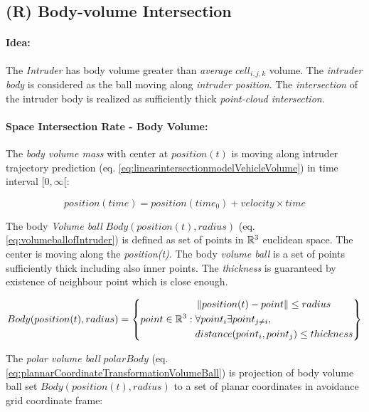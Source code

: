 \subsection{(R) Body-volume Intersection}\label{s:bodyvolumeIntersection}
\paragraph{Idea:} The \emph{Intruder} has \empty body volume greater than \emph{average} $cell_{i,j,k}$ volume. The \emph{intruder body} is considered as the ball moving along \emph{intruder position}. The \emph{intersection} of the intruder body is realized as sufficiently thick \emph{point-cloud intersection}.

\paragraph{Space Intersection Rate - Body Volume:} The \emph{body volume mass} with center at $position(t)$ is moving along intruder trajectory prediction (eq. \ref{eq:linearintersectionmodelVehicleVolume}) in time interval $[0,\infty[$:

\begin{equation}\label{eq:linearintersectionmodelVehicleVolume}
    position(time) = position(time_0) + velocity \times time
\end{equation}

\noindent The body \emph{Volume ball} $Body(position(t),radius)$ (eq. \ref{eq:volumeballofIntruder}) is defined as set of points in $\mathbb{R}^3$ euclidean space. The center is moving along the \emph{position(t)}. The body \emph{volume ball} is a set of points sufficiently thick including also inner points. The \emph{thickness} is guaranteed by existence of neighbour point which is close enough.

\begin{equation}\label{eq:volumeballofIntruder}
    Body(position(t),radius) = \left\{point \in \mathbb{R}^3:\begin{aligned}&\left\lVert position(t) - point\right\rVert \le radius\\ &\forall point_i \exists point_{j\neq i},\\ &distance(point_i,point_j)\le thickness\end{aligned} \right\}
\end{equation}

\noindent The \emph{polar volume ball} $polarBody$ (eq. \ref{eq:plannarCoordinateTransformationVolumeBall}) is projection of body volume ball  set $Body(position(t),radius)$ to a set of planar coordinates in avoidance grid coordinate frame:

